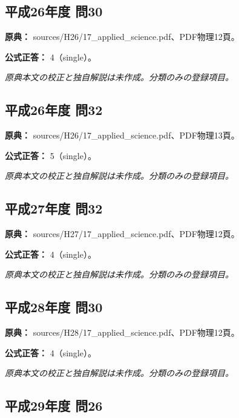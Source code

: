 \subsection{平成26年度 問30}
\label{q:h26-reg-applied-30}

\noindent\textbf{原典：} sources/H26/17\_applied\_science.pdf、PDF物理12頁。

\textbf{公式正答：} 4（single）。

\par\textit{原典本文の校正と独自解説は未作成。分類のみの登録項目。}

\subsection{平成26年度 問32}
\label{q:h26-reg-applied-32}

\noindent\textbf{原典：} sources/H26/17\_applied\_science.pdf、PDF物理13頁。

\textbf{公式正答：} 5（single）。

\par\textit{原典本文の校正と独自解説は未作成。分類のみの登録項目。}

\subsection{平成27年度 問32}
\label{q:h27-reg-applied-32}

\noindent\textbf{原典：} sources/H27/17\_applied\_science.pdf、PDF物理12頁。

\textbf{公式正答：} 4（single）。

\par\textit{原典本文の校正と独自解説は未作成。分類のみの登録項目。}

\subsection{平成28年度 問30}
\label{q:h28-reg-applied-30}

\noindent\textbf{原典：} sources/H28/17\_applied\_science.pdf、PDF物理12頁。

\textbf{公式正答：} 4（single）。

\par\textit{原典本文の校正と独自解説は未作成。分類のみの登録項目。}

\subsection{平成29年度 問26}
\label{q:h29-reg-applied-26}

